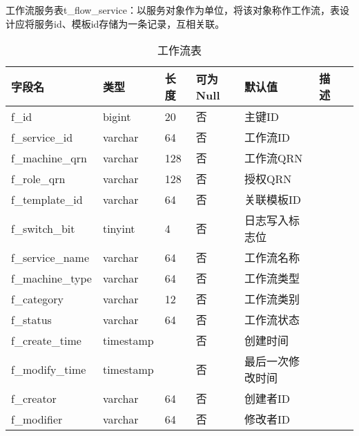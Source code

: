 工作流服务表t\_flow\_service：以服务对象作为单位，将该对象称作工作流，表设计应将服务id、模板id存储为一条记录，互相关联。
\begin{table}[H]
    \centering
    \caption{工作流表}
    \label{tab:t_flow_service}
    \begin{tabular}{lllllll}
        \toprule
        字段名	&类型	&长度	&可为Null&默认值	&描述 \\
        \midrule
        f\_id	&bigint	&20 &否& 主键ID\\
        f\_service\_id	&varchar	&64 &否& 工作流ID\\
        f\_machine\_qrn	&varchar	&128 &否& 工作流QRN\\
        f\_role\_qrn	&varchar	&128 &否& 授权QRN\\
        f\_template\_id	&varchar	&64 &否& 关联模板ID\\
        f\_switch\_bit	&tinyint	&4 &否& 日志写入标志位\\
        f\_service\_name	&varchar	&64 &否& 工作流名称\\
        f\_machine\_type	&varchar	&64 &否& 工作流类型\\
        f\_category	&varchar	&12 &否& 工作流类别\\
        f\_status	&varchar	&64 &否& 工作流状态\\
        f\_create\_time	&timestamp & &否& 创建时间\\
        f\_modify\_time   &timestamp & &否& 最后一次修改时间\\
        f\_creator	&varchar	&64 &否& 创建者ID\\
        f\_modifier	&varchar	&64 &否& 修改者ID\\
        \bottomrule
    \end{tabular}
\end{table}

